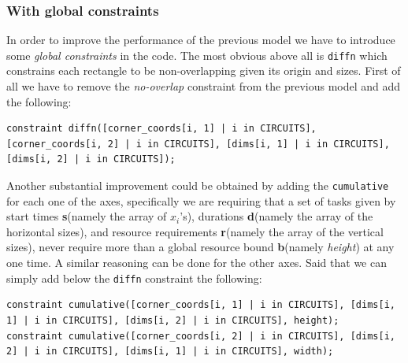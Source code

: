 \subsubsection{With global constraints}\label{global1}
In order to improve the performance of the previous model we have to introduce some \textit{global constraints} in the code. The most obvious above all is \texttt{diffn} which constrains each rectangle to be non-overlapping given its origin and sizes. First of all we have to remove the \textit{no-overlap} constraint from the previous model and add the following:
\begin{lstlisting}[language=Mzn]
constraint diffn([corner_coords[i, 1] | i in CIRCUITS], [corner_coords[i, 2] | i in CIRCUITS], [dims[i, 1] | i in CIRCUITS], [dims[i, 2] | i in CIRCUITS]);  
\end{lstlisting}
Another substantial improvement could be obtained by adding the \texttt{cumulative} for each one of the axes, specifically we are requiring that a set of tasks given by start times \textbf{s}(namely the array of $x_i$'s), durations \textbf{d}(namely the array of the horizontal sizes), and resource requirements \textbf{r}(namely the array of the vertical sizes), never require more than a global resource bound \textbf{b}(namely \textit{height}) at any one time. A similar reasoning can be done for the other axes. Said that we can simply add below the \texttt{diffn} constraint the following:
\begin{lstlisting}[language=Mzn]
constraint cumulative([corner_coords[i, 1] | i in CIRCUITS], [dims[i, 1] | i in CIRCUITS], [dims[i, 2] | i in CIRCUITS], height);            
constraint cumulative([corner_coords[i, 2] | i in CIRCUITS], [dims[i, 2] | i in CIRCUITS], [dims[i, 1] | i in CIRCUITS], width);  
\end{lstlisting}

